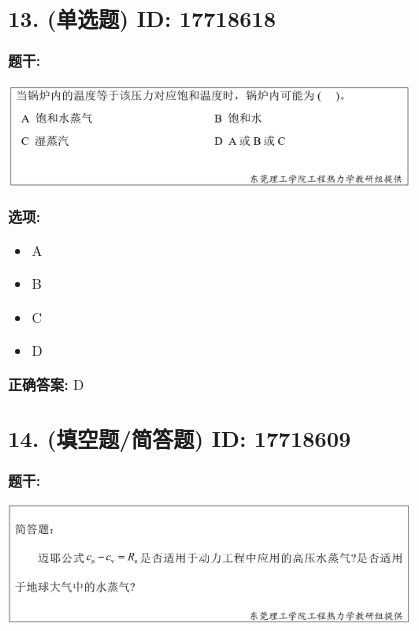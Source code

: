 \documentclass[12pt]{article}
\begin{document}
\vspace{0.5em}\hrulefill\vspace{1em}

\subsection*{13. (单选题) \small ID: 17718618}

\textbf{题干:}


\begin{center}\includegraphics[width=0.8\textwidth, height=0.25\textheight, keepaspectratio]{question_13_17718618/title_img_1.png}\end{center}

\textbf{选项:}
\begin{itemize}[leftmargin=*]
  \item A

  \item B

  \item C

  \item D

\end{itemize}

\textbf{正确答案:}
D

\vspace{0.5em}\hrulefill\vspace{1em}

\subsection*{14. (填空题/简答题) \small ID: 17718609}

\textbf{题干:}


\begin{center}\includegraphics[width=0.8\textwidth, height=0.25\textheight, keepaspectratio]{question_14_17718609/title_img_1.png}\end{center}
\end{document}
